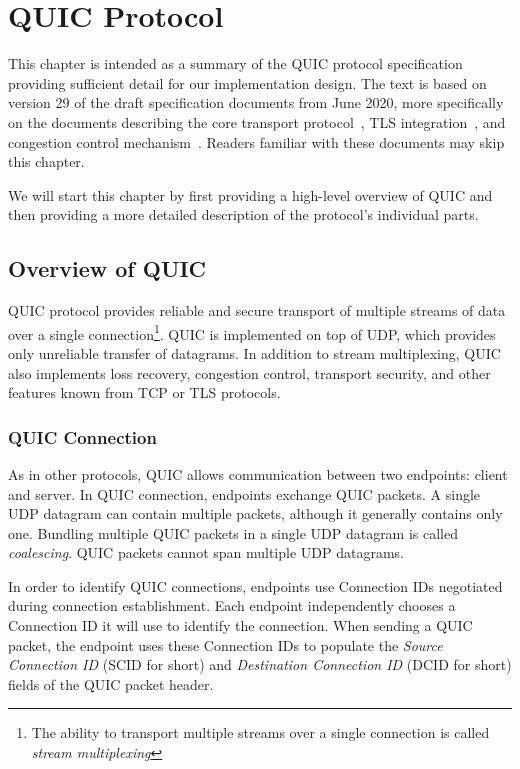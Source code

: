 \chapter{QUIC Protocol}\label{chap:02-quic}

This chapter is intended as a summary of the QUIC protocol specification providing sufficient detail
for our implementation design. The text is based on version 29 of the draft specification documents
from June 2020, more specifically on the documents describing the core transport
protocol~\cite{draft-ietf-quic-transport}, TLS integration~\cite{draft-ietf-quic-tls}, and
congestion control mechanism~\cite{draft-ietf-quic-recovery}. Readers familiar with these documents
may skip this chapter.

We will start this chapter by first providing a high-level overview of QUIC and then providing a
more detailed description of the protocol's individual parts.

\section{Overview of QUIC}

QUIC protocol provides reliable and secure transport of multiple streams of data over a single
connection\footnote{The ability to transport multiple streams over a single connection is called
\textit{stream multiplexing}}. QUIC is implemented on top of UDP, which provides only unreliable
transfer of datagrams. In addition to stream multiplexing, QUIC also implements loss recovery,
congestion control, transport security, and other features known from TCP or TLS protocols.

\subsection{QUIC Connection}

As in other protocols, QUIC allows communication between two endpoints: client and server. In QUIC
connection, endpoints exchange QUIC packets. A single UDP datagram can contain multiple packets,
although it generally contains only one. Bundling multiple QUIC packets in a single UDP datagram is
called \textit{coalescing}. QUIC packets cannot span multiple UDP datagrams.

In order to identify QUIC connections, endpoints use Connection IDs negotiated during connection
establishment. Each endpoint independently chooses a Connection ID it will use to identify the
connection. When sending a QUIC packet, the endpoint uses these Connection IDs to populate the
\textit{Source Connection ID} (SCID for short) and \textit{Destination Connection ID} (DCID for
short) fields of the QUIC packet header.

